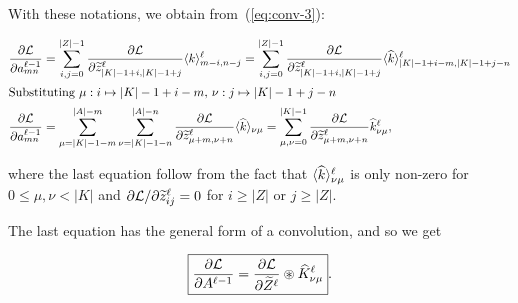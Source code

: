 \documentclass[a4paper,10pt]{article}
\def\Loss{\mathcal{L}}
\begin{document}
With these notations, we obtain from~(\ref{eq:conv-3}):

\begin{align*}
    \frac{\partial \Loss}{\partial a_{mn}^{\ell-1}} &= 
    \sum_{i,j=0}^{|Z|-1}
    \frac{\partial \Loss}{\partial \pad z_{|K|-1+i,|K|-1+j}^\ell} \ov{k}_{m-i, n-j}^\ell 
    = \sum_{i,j=0}^{|Z|-1}
    \frac{\partial \Loss}{\partial \pad z_{|K|-1+i, |K|-1+j}^\ell}
    \ov{\flip k}^\ell_{|K|-1+i-m, |K|-1+j-n} \\
    \intertext{Substituting $\mu:  i\mapsto |K|-1+i-m$, $\nu: j \mapsto |K|-1+j-n$} 
    \frac{\partial \Loss}{\partial a_{mn}^{\ell-1}}
    &= \sum_{\mu = |K|-1-m}^{|A|-m} \sum_{\nu = |K|-1-n}^{|A|-n} 
    \frac{\partial \Loss}{\partial \pad z_{\mu + m, \nu + n} ^\ell} \ov{\flip k}_{\nu \mu} = 
    \sum_{\mu, \nu = 0}^{|K|-1} 
    \frac{\partial \Loss}{\partial \pad z_{\mu + m, \nu + n}^\ell} \flip k_{\nu \mu}^\ell,
\end{align*}

where the last equation follow from the fact that
$\langle{\widehat{k}}\rangle^\ell_{\nu \mu} $ is only non-zero for $0\le \mu, \nu < |K|$ and
$\partial \Loss / \partial \pad z^\ell_{ij} =0$ for $i \ge |Z|$ or $j \ge |Z|$.

The last equation has the general form of a convolution, and so we get

\begin{equation}
    \boxed{
        \frac{\partial \Loss}{\partial A^{\ell-1}} = \frac{\partial \Loss}{\partial \pad Z^\ell} 
        \circledast \flip K_{\nu \mu}^\ell }.
\end{equation}
\end{document}
